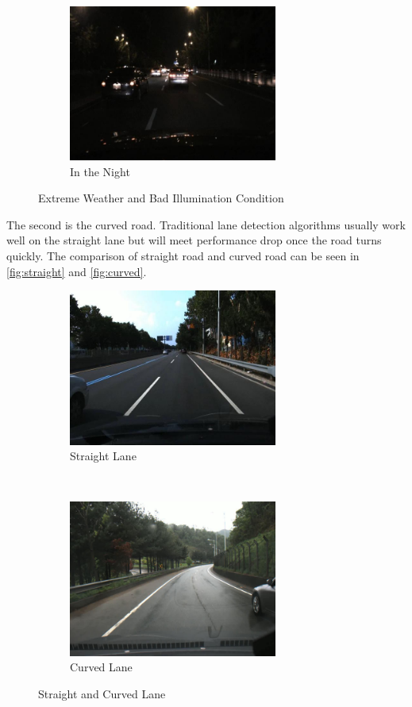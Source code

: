 \begin{spacing}{1.5}
\begin{figure}[th]
    ~
    \begin{subfigure}[b]{0.49\textwidth}
        \centering
        \includegraphics[width=2.7in, fbox]{Chapter1/night.png}
        \caption{In the Night}
        \label{fig:night} 
    \end{subfigure}
    \caption{Extreme Weather and Bad Illumination Condition}
\end{figure}

The second is the curved road. Traditional lane detection algorithms usually work well on the straight lane but will meet performance drop once the road turns quickly. The comparison of straight road and curved road can be seen in \autoref{fig:straight} and \autoref{fig:curved}.

\begin{figure}[th]
    \centering
    \begin{subfigure}[b]{0.49\textwidth}
        \centering
        \includegraphics[width=2.7in, fbox]{Chapter1/straight.png}
        \caption{Straight Lane}
        \label{fig:straight} 
    \end{subfigure}%
    ~
    \begin{subfigure}[b]{0.49\textwidth}
        \centering
        \includegraphics[width=2.7in, fbox]{Chapter1/curved.png}
        \caption{Curved Lane}
        \label{fig:curved} 
    \end{subfigure}
    \caption{Straight and Curved Lane}
\end{figure}


\end{spacing}
